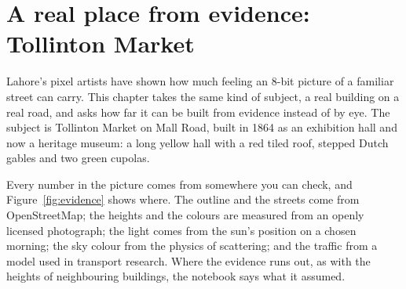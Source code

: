 \chapter{A real place from evidence: Tollinton Market}\label{ch:place}

Lahore's pixel artists have shown how much feeling an 8-bit picture of a familiar street can carry. This chapter takes the same kind of subject, a real building on a real road, and asks how far it can be built from evidence instead of by eye. The subject is Tollinton Market on Mall Road, built in 1864 as an exhibition hall and now a heritage museum: a long yellow hall with a red tiled roof, stepped Dutch gables and two green cupolas.

Every number in the picture comes from somewhere you can check, and Figure~\ref{fig:evidence} shows where. The outline and the streets come from OpenStreetMap; the heights and the colours are measured from an openly licensed photograph; the light comes from the sun's position on a chosen morning; the sky colour from the physics of scattering; and the traffic from a model used in transport research. Where the evidence runs out, as with the heights of neighbouring buildings, the notebook says what it assumed.


